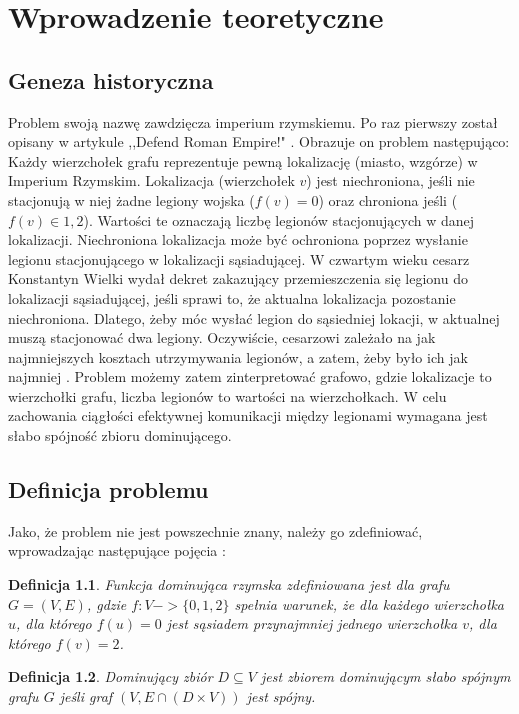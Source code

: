 \chapter{Wprowadzenie teoretyczne}

\section{Geneza historyczna}
Problem swoją nazwę zawdzięcza imperium rzymskiemu. Po raz pierwszy został opisany w artykule ,,Defend Roman Empire!" \cite{defendRomanEmpire}.
Obrazuje on problem następująco: Każdy wierzchołek grafu reprezentuje pewną lokalizację (miasto, wzgórze) w Imperium Rzymskim. Lokalizacja (wierzchołek $v$) jest niechroniona, jeśli nie stacjonują w niej żadne legiony wojska ($f(v) = 0$) oraz chroniona jeśli ($f(v) \in {1,2} $). Wartości te oznaczają liczbę legionów stacjonujących w danej lokalizacji. Niechroniona lokalizacja może być ochroniona poprzez wysłanie legionu stacjonującego w lokalizacji sąsiadującej. W czwartym wieku cesarz Konstantyn Wielki wydał dekret zakazujący przemieszczenia się legionu do lokalizacji sąsiadującej, jeśli sprawi to, że aktualna lokalizacja pozostanie niechroniona. Dlatego, żeby móc wysłać legion do sąsiedniej lokacji, w aktualnej muszą stacjonować dwa legiony. Oczywiście, cesarzowi zależało na jak najmniejszych kosztach utrzymywania legionów, a zatem, żeby było ich jak najmniej \cite{theoryWCRDF}. Problem możemy zatem zinterpretować grafowo, gdzie lokalizacje to wierzchołki grafu, liczba legionów to wartości na wierzchołkach. W celu zachowania ciągłości efektywnej komunikacji między legionami wymagana jest słabo spójność zbioru dominującego.

\section{Definicja problemu}
Jako, że problem nie jest powszechnie znany, należy go zdefiniować, wprowadzając następujące pojęcia \cite{theoryWCRDF}:

\newtheorem{definition}{Definicja}

\begin{definition}
    Funkcja dominująca rzymska zdefiniowana jest dla grafu $G = (V, E)$, gdzie $f: V -> \{0,1,2\}$ spełnia warunek, że dla każdego wierzchołka $u$, dla którego $f(u) = 0$ jest sąsiadem przynajmniej jednego wierzchołka $v$, dla którego $f(v) = 2$.
\end{definition}

\begin{definition}
    Dominujący zbiór $D \subseteq V$ jest zbiorem dominującym słabo spójnym grafu $G$ jeśli graf $(V,E \cap (D \times V))$ jest spójny.
\end{definition}

